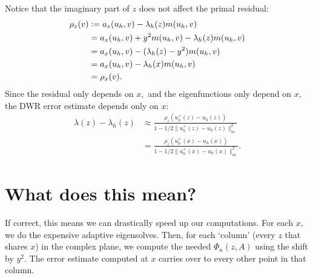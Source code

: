 \documentclass[12pt,a4paper]{article}
\newcommand{\defeq}{\vcentcolon=}
\theoremstyle{boldthm}
\theoremstyle{bolddefn}
\begin{document}
Notice that the imaginary part of $z$ does not affect the primal residual:
\begin{align}
    \rho_z(v) &\defeq a_z(u_h, v) - \lambda_h(z) m(u_h, v) \\
    &= a_x(u_h, v) + y^2 m(u_h, v) - \lambda_h(z) m(u_h, v) \\
    &= a_x(u_h, v) - (\lambda_h(z) - y^2) m(u_h, v) \\
    &= a_x(u_h, v) - \lambda_h(x) m(u_h, v) \\
    &= \rho_x(v).  
\end{align}
Since the residual only depends on $x,$ and the eigenfunctions only depend on $x,$ the DWR error estimate depends only on $x$:
\begin{align}
    \lambda(z) - \lambda_h(z) &\approx \frac{\rho_z(u_h^+(z) - u_h(z))}{1 - 1/2 \| u_h^+(z) - u_h(z) \|_m^2 }\\
    &= \frac{\rho_z(u_h^+(x) - u_h(x))}{1 - 1/2 \| u_h^+(x) - u_h(x) \|_m^2 }.
\end{align}


\section{What does this mean?}

If correct, this means we can drastically speed up our computations. For each $x,$ we do the expensive adaptive eigensolves. Then, for each `column' (every $z$ that shares $x$) in the complex plane, we compute the needed $\Phi_n(z, A)$ using the shift by $y^2.$ The error estimate computed at $x$ carries over to every other point in that column.
\end{document}
